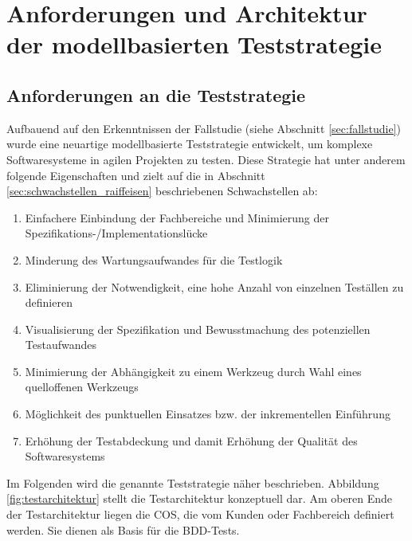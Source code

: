 \chapter{Anforderungen und Architektur der modellbasierten Teststrategie}
\label{sec:results}
\section{Anforderungen an die Teststrategie}
\label{sec:anforderungen_teststrategie}
Aufbauend auf den Erkenntnissen der Fallstudie (siehe Abschnitt \ref{sec:fallstudie}) wurde eine neuartige modellbasierte Teststrategie entwickelt, um komplexe Softwaresysteme in agilen Projekten zu testen. Diese Strategie hat unter anderem folgende Eigenschaften und zielt auf die in Abschnitt \ref{sec:schwachstellen_raiffeisen} beschriebenen Schwachstellen ab:

\begin{enumerate}
\item Einfachere Einbindung der Fachbereiche und Minimierung der Spezifikations-/Implementationslücke
\item Minderung des Wartungsaufwandes für die Testlogik
\item Eliminierung der Notwendigkeit, eine hohe Anzahl von einzelnen Teställen zu definieren
\item Visualisierung der Spezifikation und Bewusstmachung des potenziellen Testaufwandes
\item Minimierung der Abhängigkeit zu einem Werkzeug durch Wahl eines quelloffenen Werkzeugs
\item Möglichkeit des punktuellen Einsatzes bzw. der inkrementellen Einführung
\item Erhöhung der Testabdeckung und damit Erhöhung der Qualität des Softwaresystems
\end{enumerate}

Im Folgenden wird die genannte Teststrategie näher beschrieben. Abbildung \ref{fig:testarchitektur} stellt die Testarchitektur konzeptuell dar. Am oberen Ende der Testarchitektur liegen die \gls{COS}, die vom Kunden oder Fachbereich definiert werden. Sie dienen als Basis für die BDD-Tests. 

